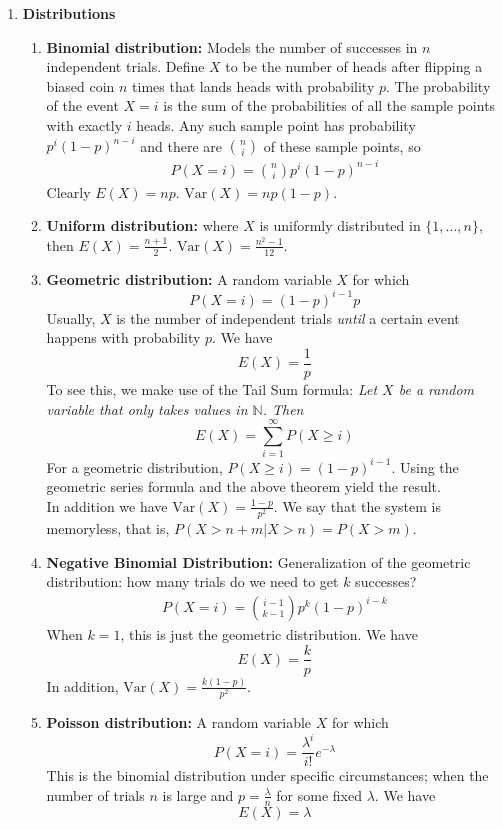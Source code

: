 \documentclass[10pt]{article}
\begin{document}
\begin{multicols}{2}
\begin{enumerate}
        \item \textbf{Distributions}
        \begin{enumerate}
            \item \textbf{Binomial distribution:} Models the number of successes in $n$ independent trials. Define $X$ to be the number of heads after flipping a biased coin $n$ times that lands heads with probability $p$. The probability of the event $X = i$ is the sum of the probabilities of all the sample points with exactly $i$ heads. Any such sample point has probability $p^i(1-p)^{n-i}$ and there are ${n \choose i}$ of these sample points, so 
            \begin{align*}
                P(X = i) = {n \choose i} p^i(1-p)^{n-i}
            \end{align*}
            Clearly $E(X)=np$. $\text{Var}(X)=np(1-p)$.
            \item \textbf{Uniform distribution:} where $X$ is uniformly distributed in $\{1,\ldots,n\}$, then $E(X) = \frac{n+1}{2}$. $\text{Var}(X)=\frac{n^2-1}{12}$.
            \item \textbf{Geometric distribution:} A random variable $X$ for which $$P(X=i)=(1-p)^{i-1}p$$ Usually, $X$ is the number of independent trials \textit{until} a certain event happens with probability $p$. We have $$E(X) = \frac{1}{p}$$
            To see this, we make use of the Tail Sum formula: \textit{Let $X$ be a random variable that only takes values in $\mathbb{N}$. Then}
            $$E(X) = \sum_{i=1}^{\infty} P(X \geq i)$$
            For a geometric distribution, $P(X \geq i)=(1-p)^{i-1}$. Using the geometric series formula and the above theorem yield the result. \\ In addition we have $\text{Var}(X)=\frac{1-p}{p^2}$. We say that the system is memoryless, that is, $P(X > n+m | X > n) = P(X > m)$.
            \item \textbf{Negative Binomial Distribution:} Generalization of the geometric distribution: how many trials do we need to get $k$ successes? 
            \begin{align*}
                P(X=i)={i-1 \choose k-1} p^k (1-p)^{i-k}
            \end{align*}
            When $k=1$, this is just the geometric distribution. We have $$E(X)=\frac{k}{p}$$ In addition, $\text{Var}(X)=\frac{k(1-p)}{p^2}$. 
            \item \textbf{Poisson distribution:} A random variable $X$ for which $$P(X=i) = \frac{\lambda^i}{i!}e^{-\lambda}$$ This is the binomial distribution under specific circumstances; when the number of trials $n$ is large and $p=\frac{\lambda}{n}$ for some fixed $\lambda$. We have $$E(X)=\lambda$$

\end{enumerate}
\end{enumerate}
\end{multicols}
\end{document}
